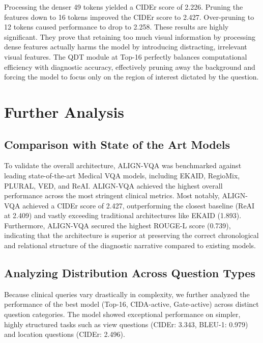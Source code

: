 Processing the denser 49 tokens yielded a CIDEr score of 2.226. Pruning the features down to 16 tokens improved the CIDEr score to 2.427. Over-pruning to 12 tokens caused performance to drop to 2.258. These results are highly significant. They prove that retaining too much visual information by processing dense features actually harms the model by introducing distracting, irrelevant visual features. The QDT module at Top-16 perfectly balances computational efficiency with diagnostic accuracy, effectively pruning away the background and forcing the model to focus only on the region of interest dictated by the question.


\section{Further Analysis}
\subsection{Comparison with State of the Art Models}
To validate the overall architecture, ALIGN-VQA was benchmarked against leading state-of-the-art Medical VQA models, including EKAID, RegioMix, PLURAL, VED, and ReAI.
ALIGN-VQA achieved the highest overall performance across the most stringent clinical metrics. Most notably, ALIGN-VQA achieved a CIDEr score of 2.427, outperforming the closest baseline (ReAI at 2.409) and vastly exceeding traditional architectures like EKAID (1.893). Furthermore, ALIGN-VQA secured the highest ROUGE-L score (0.739), indicating that the architecture is superior at preserving the correct chronological and relational structure of the diagnostic narrative compared to existing models.

\subsection{Analyzing Distribution Across Question Types}
Because clinical queries vary drastically in complexity, we further analyzed the performance of the best model (Top-16, CIDA-active, Gate-active) across distinct question categories. The model showed exceptional performance on simpler, highly structured tasks such as view questions (CIDEr: 3.343, BLEU-1: 0.979) and location questions (CIDEr: 2.496).

